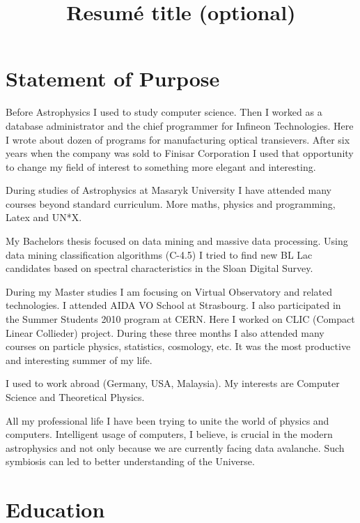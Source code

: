 \documentclass[11pt,a4paper]{moderncv}
\title{Resumé title (optional)}               %
\begin{document}
\maketitle

\section{Statement of Purpose}
\vspace{5mm}
\setlength{\parindent}{5mm}

\noindent Before Astrophysics I used to study computer science. Then I worked as
a database administrator and the chief programmer for Infineon
Technologies. Here I wrote about dozen of programs for manufacturing
optical transievers. After six years when the company was sold to
Finisar Corporation I used that opportunity to change my field of
interest to something more elegant and interesting.


\indent During studies of Astrophysics at Masaryk University I have attended
many courses beyond standard curriculum. More maths, physics and
programming, Latex and UN*X.


\indent My Bachelors thesis focused on data mining and massive data
processing. Using data mining classification algorithms (C-4.5) I
tried to find new BL Lac candidates based on spectral characteristics
in the Sloan Digital Survey.


\indent During my Master studies I am focusing on Virtual Observatory and
related technologies. I attended AIDA VO School at Strasbourg. I also
participated in the Summer Students 2010 program at CERN. Here I
worked on CLIC (Compact Linear Collieder) project. During these three
months I also attended many courses on particle physics,
statistics, cosmology, etc. It was the most productive and interesting
summer of my life.


\indent I used to work abroad (Germany, USA, Malaysia). My interests are
Computer Science and Theoretical Physics.


\indent All my professional life I have been trying to unite the world of
physics and computers. Intelligent usage of computers, I believe, is
crucial in the modern astrophysics and not only because we are
currently facing data avalanche. Such symbiosis can led to better
understanding of the Universe.

\newpage

\section{Education}
\end{document}
